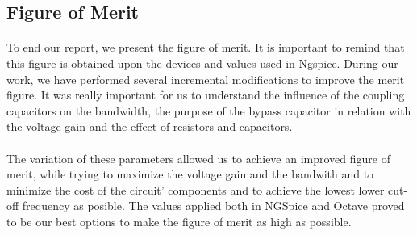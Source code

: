 \subsection{Figure of Merit}
\label{subsec:Figure_of_Merit}


\paragraph{}
To end our report, we present the figure of merit. It is important to remind that this figure is obtained upon the devices and values used in Ngspice. During our work, we have performed several incremental modifications to improve the merit figure. It was really important for us to understand the influence of the coupling capacitors on the bandwidth, the purpose of the bypass capacitor in relation with the voltage gain and the effect of resistors and capacitors. 

\paragraph{}
The variation of these parameters allowed us to achieve an improved figure of merit, while trying to maximize the voltage gain and the bandwith and to minimize the cost of the circuit' components and to achieve the lowest lower cut-off frequency as posible. The values applied both in NGSpice and Octave proved to be our best options to make the figure of merit as high as possible.
